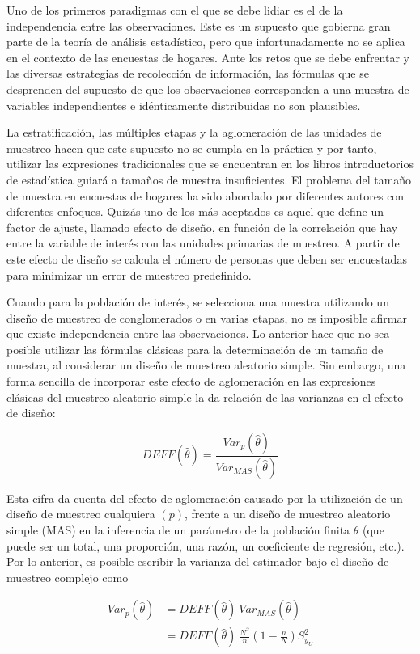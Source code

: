 \documentclass[
  12pt,
  spanish,
]{book}
\begin{document}
Uno de los primeros paradigmas con el que se debe lidiar es el de la independencia entre las observaciones. Este es un supuesto que gobierna gran parte de la teoría de análisis estadístico, pero que infortunadamente no se aplica en el contexto de las encuestas de hogares. Ante los retos que se debe enfrentar y las diversas estrategias de recolección de información, las fórmulas que se desprenden del supuesto de que los observaciones corresponden a una muestra de variables independientes e idénticamente distribuidas no son plausibles.

La estratificación, las múltiples etapas y la aglomeración de las unidades de muestreo hacen que este supuesto no se cumpla en la práctica y por tanto, utilizar las expresiones tradicionales que se encuentran en los libros introductorios de estadística guiará a tamaños de muestra insuficientes. El problema del tamaño de muestra en encuestas de hogares ha sido abordado por diferentes autores con diferentes enfoques. Quizás uno de los más aceptados es aquel que define un factor de ajuste, llamado efecto de diseño, en función de la correlación que hay entre la variable de interés con las unidades primarias de muestreo. A partir de este efecto de diseño se calcula el número de personas que deben ser encuestadas para minimizar un error de muestreo predefinido.

Cuando para la población de interés, se selecciona una muestra utilizando un diseño de muestreo de conglomerados o en varias etapas, no es imposible afirmar que existe independencia entre las observaciones. Lo anterior hace que no sea posible utilizar las fórmulas clásicas para la determinación de un tamaño de muestra, al considerar un diseño de muestreo aleatorio simple. Sin embargo, una forma sencilla de incorporar este efecto de aglomeración en las expresiones clásicas del muestreo aleatorio simple la da relación de las varianzas en el efecto de diseño:

\[
DEFF(\hat{\theta})=\frac{Var_p(\hat{\theta})}{Var_{MAS}(\hat{\theta})}
\]

Esta cifra da cuenta del efecto de aglomeración causado por la utilización de un diseño de muestreo cualquiera \((p)\), frente a un diseño de muestreo aleatorio simple (MAS) en la inferencia de un parámetro de la población finita \(\theta\) (que puede ser un total, una proporción, una razón, un coeficiente de regresión, etc.). Por lo anterior, es posible escribir la varianza del estimador bajo el diseño de muestreo complejo como

\begin{align}
Var_p(\hat{\theta}) & = DEFF(\hat{\theta}) \ Var_{MAS}(\hat{\theta}) \\
& = DEFF(\hat{\theta}) \ \frac{N^2}{n}\left(1-\frac{n}{N}\right)S^2_{y_U}
\end{align}
\end{document}
